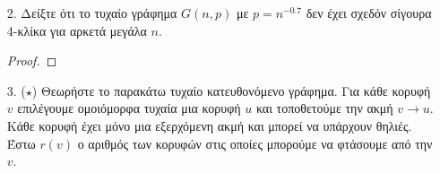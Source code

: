 \documentclass[a4paper, oneside, 11pt]{article}
\newtheorem{lm}[thm]{Λήμμα}
\theoremstyle{definition}
\newcommand{\pr}{\mathbb{P}}
\newcommand{\ex}{\mathbb{E}}
\begin{document}
\begin{enumerate}
\begin{proof}
      \begin{lm}
         \label{lm1.3}
         Αν $X \sim B(n, p)$ τότε $\ex[X] = np$.
      \end{lm}
      \begin{proof}
         \begin{align*}
            \ex[X] &= \sum_{i=0}^{n} i \cdot \pr[X = i]\\
                   &= \sum_{i=0}^{n} i {n \choose i} p^i (1-p)^{n-i}\\
                   &= \sum_{i=1}^{n} np {n-1 \choose i-1} p^{i-1}
                      (1-p)^{(n-1) - (i-1)}\\
                   &= np \sum_{i=0}^{n-1} {n-1 \choose i} p^{i}
                      (1-p)^{(n-1) - i}\\
                   &= np \cdot (p + (1-p))^{n-1} = np\\
         \end{align*}
      \end{proof}

      Για το γράφημα $G(n, p)$ έχουμε
      ότι ο βαθμός μιας κορυφής $v_i$ είναι μια τυχαία μεταβλητή $d_i$ που ακολουθεί
      την κατανομή Bernoulli με παραμέτρους $n-1, p$, δηλαδή $d_i \sim B(n-1,
      p)$.

      Για τον μέσο βαθμό κορυφής ισχύει:

      \[ d(G) = \frac{\sum_{i=1}^{n} d_i}{n} \]

      όπου $X = \sum_{i=1}^{n} d_i$.
      
      Σύμφωνα με το Λήμμα \ref{lm1.2} έχουμε ότι $X \sim B \left(\sum_{i=1}^{n}
      (n-1), p \right) = B( n(n-1), p)$.

      Από το Λήμμα \ref{lm1.3}, $\ex[X] = n(n-1)p$. Άρα έχουμε ότι:

      \[ \ex[d(G)] = \frac1n \ex[X] = (n-1)p \]
   \end{proof}

\item[2.]
   Δείξτε ότι το τυχαίο γράφημα $G(n, p)$ με $p = n^{-0.7}$ δεν έχει σχεδόν
   σίγουρα 4-κλίκα για αρκετά μεγάλα $n$.

   \begin{proof}
   \end{proof}

\item[3. ($\star$)]
   Θεωρήστε το παρακάτω τυχαίο κατευθονόμενο γράφημα. Για κάθε κορυφή $v$
   επιλέγουμε ομοιόμορφα τυχαία μια κορυφή $u$ και τοποθετούμε την ακμή
   $v \rightarrow u$. Κάθε κορυφή έχει μόνο μια εξερχόμενη ακμή και μπορεί να
   υπάρχουν θηλιές. Έστω $r(v)$ ο αριθμός των κορυφών στις οποίες μπορούμε να
   φτάσουμε από την $v$.


\end{enumerate}
\end{document}
